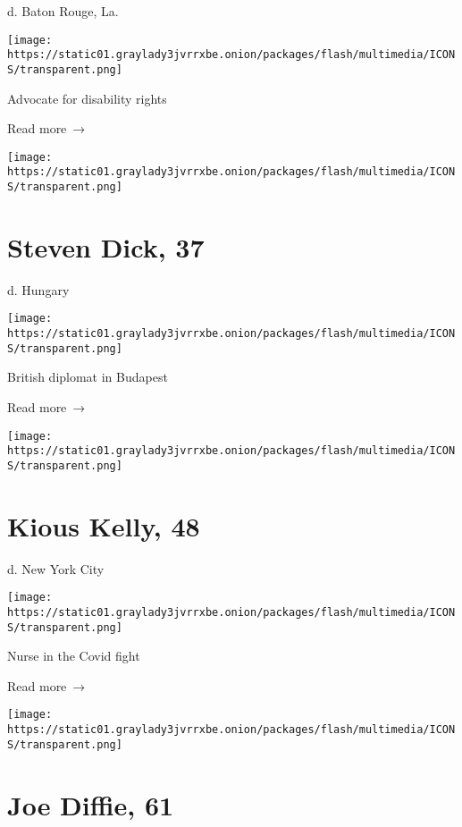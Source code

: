 d. Baton Rouge, La.

\texttt{[image: https://static01.graylady3jvrrxbe.onion/packages/flash/multimedia/ICONS/transparent.png]}

Advocate for disability rights

 Read more~→

\href{https://www.nytimes3xbfgragh.onion/2020/03/31/obituaries/steven-dick-dead-coronavirus.html}{}

\texttt{[image: https://static01.graylady3jvrrxbe.onion/packages/flash/multimedia/ICONS/transparent.png]}

\hypertarget{steven-dick-37}{%
\section{Steven Dick, 37}\label{steven-dick-37}}

d. Hungary

\texttt{[image: https://static01.graylady3jvrrxbe.onion/packages/flash/multimedia/ICONS/transparent.png]}

British diplomat in Budapest

 Read more~→

\href{https://www.nytimes3xbfgragh.onion/2020/03/31/obituaries/kious-kelly-dead-coronavirus.html}{}

\texttt{[image: https://static01.graylady3jvrrxbe.onion/packages/flash/multimedia/ICONS/transparent.png]}

\hypertarget{kious-kelly-48}{%
\section{Kious Kelly, 48}\label{kious-kelly-48}}

d. New York City

\texttt{[image: https://static01.graylady3jvrrxbe.onion/packages/flash/multimedia/ICONS/transparent.png]}

Nurse in the Covid fight

 Read more~→

\href{https://www.nytimes3xbfgragh.onion/2020/03/30/arts/music/joe-diffie-dead-coronavirus.html}{}

\texttt{[image: https://static01.graylady3jvrrxbe.onion/packages/flash/multimedia/ICONS/transparent.png]}

\hypertarget{joe-diffie-61}{%
\section{Joe Diffie, 61}\label{joe-diffie-61}}

